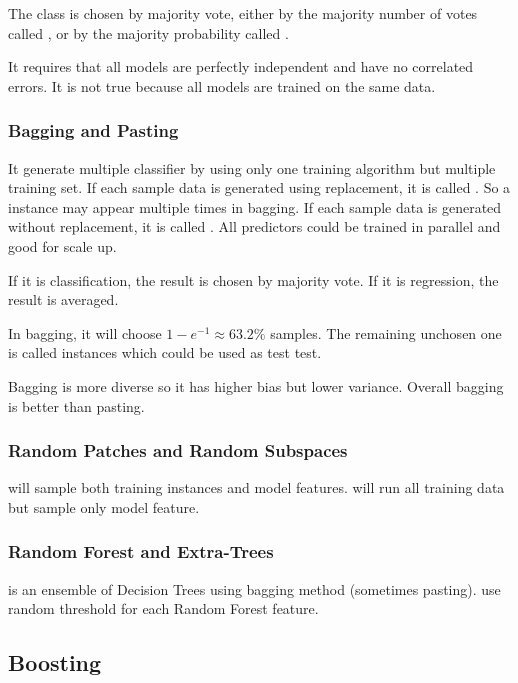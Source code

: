 The class is chosen by majority vote, either by the majority number of votes called , or by the majority probability called .


It requires that all models are perfectly independent and have no correlated errors. It is not true because all models are trained on the same data.

\subsubsection{Bagging and Pasting}

It generate multiple classifier by using only one training algorithm but multiple training set. If each sample data is generated using replacement, it is called . So a instance may appear multiple times in bagging. If each sample data is generated without replacement, it is called . All predictors could be trained in parallel and good for scale up.

If it is classification, the result is chosen by majority vote. If it is regression, the result is averaged.

In bagging, it will choose $1 - e^{-1} \approx 63.2\%$ samples. The remaining unchosen one is called  instances which could be used as test test.

Bagging is more diverse so it has higher bias but lower variance. Overall bagging is better than pasting.



\subsubsection{Random Patches and Random Subspaces}


 will sample both training instances and model features.  will run all training data but sample only model feature.


\subsubsection{Random Forest and Extra-Trees}

 is an ensemble of Decision Trees using bagging method (sometimes pasting).  use random threshold for each Random Forest feature.


\subsection{Boosting}

